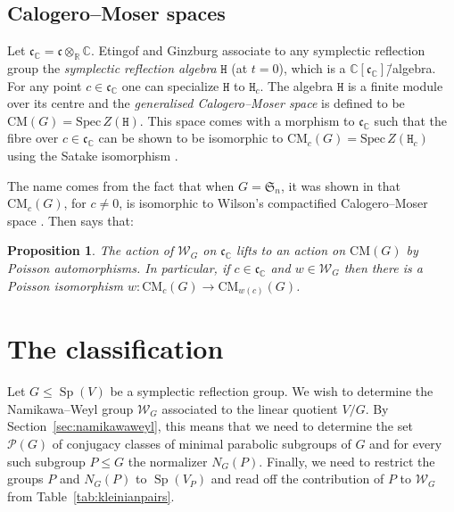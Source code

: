 \documentclass[a4paper]{amsart}
\theoremstyle{plain}
\newtheorem{proposition}[theorem]{Proposition}
\theoremstyle{definition}
\theoremstyle{remark}
\DeclareMathOperator{\Sp}{Sp}
\newcommand{\CC}{\mathbb C}
\newcommand{\RR}{\mathbb R}
\newcommand{\SRA}{\mathtt{H}}
\begin{document}
\subsection{Calogero--Moser spaces}\label{sec:CM}

Let $\mathfrak{c}_{\CC} = \mathfrak{c} \otimes_{\RR} \CC$. Etingof and Ginzburg \cite{EG} associate to any symplectic reflection group the \emph{symplectic reflection algebra} $\SRA$ (at $t = 0$), which is a $\CC[\mathfrak{c}_{\CC}]$\=/algebra. For any point $c \in \mathfrak{c}_{\CC}$ one can specialize $\SRA$ to $\SRA_c$. The algebra $\SRA$ is a finite module over its centre and the \emph{generalised Calogero--Moser space} is defined to be $\mathrm{CM}(G) = \mathrm{Spec} \, Z(\SRA)$. This space comes with a morphism to $\mathfrak{c}_{\CC}$ such that the fibre over $c \in \mathfrak{c}_{\CC}$ can be shown to be isomorphic to $\mathrm{CM}_c(G) = \mathrm{Spec} \, Z(\SRA_c)$ using the Satake isomorphism \cite[Thm.~3.1]{EG}. 

The name comes from the fact that when $G = \mathfrak{S}_n$, it was shown in \cite[Thm.~1.13]{EG} that $\mathrm{CM}_c(G)$, for $c \neq 0$, is isomorphic to Wilson's compactified Ca\-lo\-ge\-ro--Moser space \cite{Wilson}. Then \cite[Thm.~1.4]{Bel16} says that:

\begin{proposition}
	The action of $\mathcal{W}_G$ on $\mathfrak{c}_{\CC}$ lifts to an action on $\mathrm{CM}(G)$ by Poisson automorphisms. In particular, if $c \in \mathfrak{c}_{\CC}$ and $w \in \mathcal{W}_G$ then there is a Poisson isomorphism $w \colon \mathrm{CM}_c(G) \to \mathrm{CM}_{w(c)}(G)$. 
\end{proposition} 

\section{The classification}

Let \(G\leqslant\Sp(V)\) be a symplectic reflection group. We wish to determine the Namikawa--Weyl group \(\mathcal W_G\) associated to the linear quotient \(V/G\). By Section~\ref{sec:namikawaweyl}, this means that we need to determine the set \(\mathcal P(G)\) of conjugacy classes of minimal parabolic subgroups of \(G\) and for every such subgroup \(P\leqslant G\) the normalizer \(N_G(P)\). Finally, we need to restrict the groups \(P\) and \(N_G(P)\) to \(\Sp(V_P) \) and read off the contribution of \(P\) to \(\mathcal W_G\) from Table~\ref{tab:kleinianpairs}.
\end{document}
